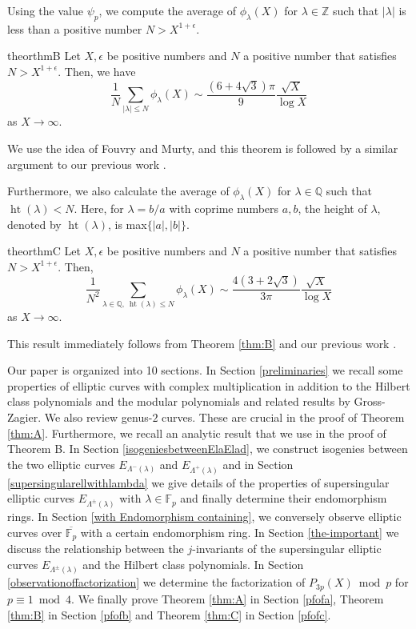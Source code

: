 \documentclass[a4paper, 11pt]{article}
\theoremstyle{plain}
\newcommand{\?}{\textcolor{red}{??}}
\newcommand{\lm}{\lambda}
\newcommand{\Lm}{\Lambda}
\newcommand{\fp}{\mathbb{F}_p}
\newcommand{\bQ}{\mathbb{Q}}
\newcommand{\bZ}{\mathbb{Z}}
\newcommand{\height}{\operatorname{ht}}
\begin{document}
Using the value $\psi_p$, we compute the average of $\phi_{\lm}(X)$ for $\lm \in \bZ$ such that $|\lm|$ is less than a positive number $N>X^{1+\epsilon}$.
 \begin{restatable}{theor}{thmB}
 \label{thm:B}
    Let $X,\epsilon$ be positive numbers and $N$ a positive number that satisfies $N > X^{1+\epsilon}$. Then, we have
    \[
   \frac{1}{N} \sum_{\lvert \lm \rvert \le N} {\phi}_{\lm}(X) \sim \frac{(6+4\sqrt{3})\pi}{9} \frac{\sqrt{X}}{\log X} 
    \]
    as $X \rightarrow \infty$.
\end{restatable}
We use the idea of Fouvry and Murty, and this theorem is followed by a similar argument to our previous work \cite[\S 5]{Ando}.

Furthermore, we also calculate the average of $\phi_\lm(X)$ for $\lm\in \bQ$ such that $\height{(\lm)}<N$. Here, for $\lm=b/a$ with coprime numbers $a,b$, the height of $\lm$, denoted by $\height{(\lm)}$, is max$\{|a|,|b|\}$.
\begin{restatable}{theor}{thmC} \label{thm:C}
      Let $X,\epsilon$ be positive numbers and $N$ a positive number that satisfies $N > X^{1+\epsilon}$. Then,
    \[
   \frac{1}{N^2} \sum_{\lm \in \bQ,\ \height(\lm) \le N } {\phi}_{\lm}(X) \sim \frac{4(3+2\sqrt{3})}{3\pi} \frac{\sqrt{X}}{\log X} 
    \]
    as $X \rightarrow \infty$.
 \end{restatable}
 This result immediately follows from Theorem \ref{thm:B} and our previous work \cite[\S 6]{Ando}.

Our paper is organized into 10 sections. In Section \ref{preliminaries} we recall some properties of elliptic curves with complex multiplication in addition to the Hilbert class polynomials and the modular polynomials and related results by Gross-Zagier. We also review genus-$2$ curves. These are crucial in the proof of Theorem \ref{thm:A}.  Furthermore, we recall an analytic result that we use in the proof of Theorem B. In Section \ref{isogeniesbetweenElaElad}, we construct isogenies between the two elliptic curves $E_{\Lm^{-}(\lm)}$ and $E_{\Lm^{+}(\lm)}$ and in Section \ref{supersingularellwithlambda} we give details of the properties of supersingular elliptic curves $E_{\Lm^{\pm}(\lm)}$ with $\lm \in \fp$ and finally determine their endomorphism rings. In Section \ref{with Endomorphism containing}, we conversely observe elliptic curves over $\overline{\fp}$ with a certain endomorphism ring. In Section \ref{the-important} we discuss the relationship between the $j$-invariants of the supersingular elliptic curves $E_{\Lm^{\pm}(\lm)}$ and the Hilbert class polynomials. In Section \ref{observationoffactorization} we determine the factorization of $P_{3p}(X) \bmod p$ for $p \equiv1 \bmod 4$. We finally prove Theorem \ref{thm:A} in Section \ref{pfofa}, Theorem \ref{thm:B} in Section \ref{pfofb} and Theorem \ref{thm:C} in Section \ref{pfofc}. 
\end{document}
